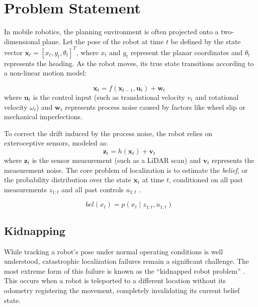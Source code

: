 \section{Problem Statement}\label{sec:Problem-Statement}
In mobile robotics, the planning environment is often projected onto a two-dimensional plane.
Let the pose of the robot at time $t$ be defined by the state vector $\mathbf{x}_t = [x_t, y_t, \theta_t]^T$, where $x_t$ and $y_t$ represent the planar coordinates and $\theta_t$ represents the heading. As the robot moves, its true state transitions according to a non-linear motion model:

\begin{equation}
    \mathbf{x}_t = f(\mathbf{x}_{t-1}, \mathbf{u}_t) + \mathbf{w}_t
\end{equation}
where $\mathbf{u}_t$ is the control input (such as translational velocity $v_t$ and rotational velocity $\omega_t$) and $\mathbf{w}_t$ represents process noise caused by factors like wheel slip or mechanical imperfections. 

To correct the drift induced by the process noise, the robot relies on exteroceptive sensors, modeled as:
\begin{equation}
    \mathbf{z}_t = h(\mathbf{x}_t) + \mathbf{v}_t
\end{equation}
where $\mathbf{z}_t$ is the sensor measurement (such as a LiDAR scan) and $\mathbf{v}_t$ represents the measurement noise. 
The core problem of localization is to estimate the \textit{belief}, or the probability distribution over the state $\mathbf{x}_t$ at time $t$, conditioned on all past measurements $z_{1:t}$ and all past controls $u_{1:t}$ \cite{thrun2005probabilistic}.

\begin{equation}\label{eq:belief}
    bel(x_t) = p(x_t \mid z_{1:t}, u_{1:t})
\end{equation}

\subsection{Kidnapping}
While tracking a robot's pose under normal operating conditions is well understood, catastrophic localization failures remain a significant challenge. 
The most extreme form of this failure is known as the ``kidnapped robot problem'' \cite{DBLP:journals/corr/abs-1106-0222}. 
This occurs when a robot is teleported to a different location without its odometry registering the movement, completely invalidating its current belief state.

